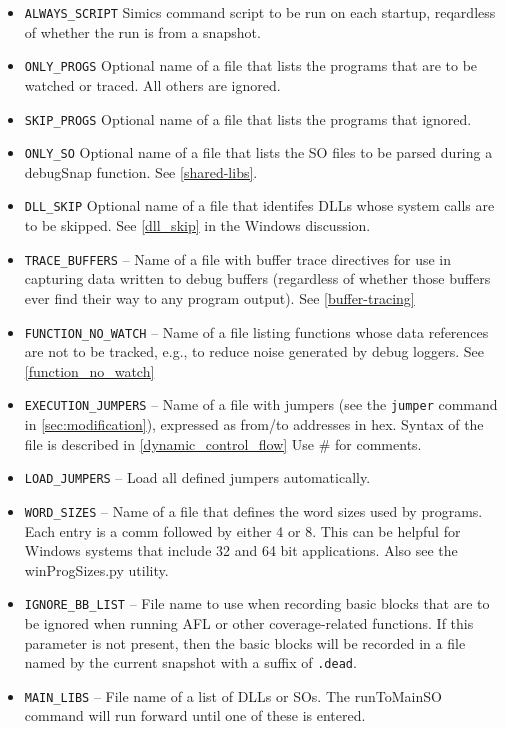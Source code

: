 \documentclass[titlepage]{article}
\begin{document}
\begin{itemize}
\item {\tt ALWAYS\_SCRIPT} Simics command script to be run on each startup, reqardless of whether the run is from a snapshot.
\item {\tt ONLY\_PROGS} Optional name of a file that lists the programs that are to be watched or traced.  All others are ignored.
\item {\tt SKIP\_PROGS} Optional name of a file that lists the programs that ignored.
\item {\tt ONLY\_SO} Optional name of a file that lists the SO files to be parsed during a debugSnap function. See \ref{shared-libs}.
\item {\tt DLL\_SKIP} Optional name of a file that identifes DLLs whose system calls are to be skipped.  See \ref{dll_skip} in the Windows discussion.
\item {\tt TRACE\_BUFFERS} -- Name of a file with buffer trace directives for use in capturing data written to debug buffers (regardless of whether those
buffers ever find their way to any program output). See \ref{buffer-tracing}
\item {\tt FUNCTION\_NO\_WATCH} -- Name of a file listing functions whose data references are not to be tracked, e.g., to reduce noise generated by debug loggers. See 
\ref{function_no_watch}
\item {\tt EXECUTION\_JUMPERS} -- Name of a file with jumpers (see the {\tt jumper} command in \ref{sec:modification}), expressed as 
from/to addresses in hex.  Syntax of the file is described in \ref{dynamic_control_flow}  Use \# for comments.  
\item {\tt LOAD\_JUMPERS} -- Load all defined jumpers automatically.
\item {\tt WORD\_SIZES} -- Name of a file that defines the word sizes used by programs.  Each entry is a comm followed by either 4 or 8.
This can be helpful for Windows systems that include 32 and 64 bit applications.  Also see the winProgSizes.py utility.
\item {\tt IGNORE\_BB\_LIST} -- File name to use when recording basic blocks that are to be ignored when running AFL or other coverage-related functions.  If this parameter
is not present, then the basic blocks will be recorded in a file named by the current snapshot with a suffix of {\tt .dead}.
\item {\tt MAIN\_LIBS} -- File name of a list of DLLs or SOs.  The runToMainSO command will run forward until one of these is entered.
\end{itemize}
\end{document}
